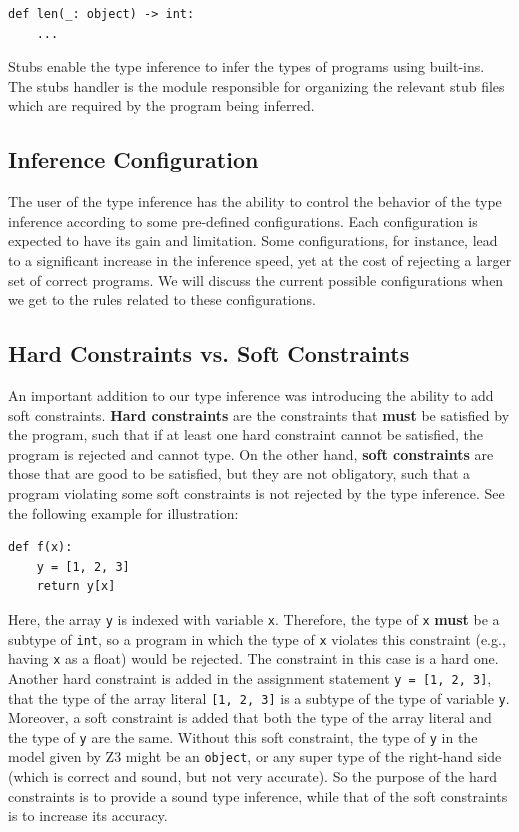 \begin{lstlisting}
def len(_: object) -> int:
	...
\end{lstlisting}

Stubs enable the type inference to infer the types of programs using built-ins. The stubs handler is the module responsible for organizing the relevant stub files which are required by the program being inferred.
\subsection{Inference Configuration}
The user of the type inference has the ability to control the behavior of the type inference according to some pre-defined configurations. Each configuration is expected to have its gain and limitation. Some configurations, for instance, lead to a significant increase in the inference speed, yet at the cost of rejecting a larger set of correct programs. We will discuss the current possible configurations when we get to the rules related to these configurations.
\subsection{Hard Constraints vs. Soft Constraints}
An important addition to our type inference was introducing the ability to add soft constraints. \textbf{Hard constraints} are the constraints that \textbf{must} be satisfied by the program, such that if at least one hard constraint cannot be satisfied, the program is rejected and cannot type. On the other hand, \textbf{soft constraints} are those that are good to be satisfied, but they are not obligatory, such that a program violating some soft constraints is not rejected by the type inference. See the following example for illustration:

\begin{lstlisting}
def f(x):
	y = [1, 2, 3]
	return y[x]
\end{lstlisting}

Here, the array \lstinline|y| is indexed with variable \lstinline|x|. Therefore, the type of \lstinline|x| \textbf{must} be a subtype of \lstinline|int|, so a program in which the type of \lstinline|x| violates this constraint (e.g., having \lstinline|x| as a float) would be rejected. The constraint in this case is a hard one. Another hard constraint is added in the assignment statement \lstinline|y = [1, 2, 3]|, that the type of the array literal \lstinline|[1, 2, 3]| is a subtype of the type of variable \lstinline|y|. Moreover, a soft constraint is added that both the type of the array literal and the type of \lstinline|y| are the same. Without this soft constraint, the type of \lstinline|y| in the model given by Z3 might be an \lstinline|object|, or any super type of the right-hand side (which is correct and sound, but not very accurate). So the purpose of the hard constraints is to provide a sound type inference, while that of the soft constraints is to increase its accuracy.
